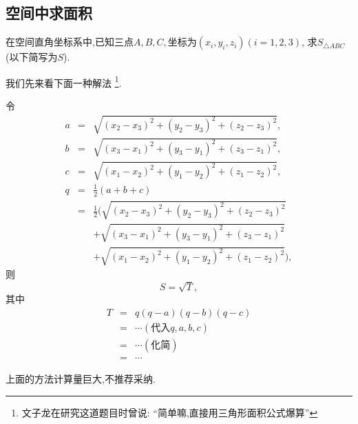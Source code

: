 \subsection{空间中求面积}

\prob 在空间直角坐标系中,已知三点$A,B,C,
\textrm{坐标为}(x_i,y_i,z_i)(i=1,2,3)$,
求$S_{\triangle ABC}$(以下简写为$S$).

我们先来看下面一种解法
\footnote{文子龙在研究这道题目时曾说:
``简单嘛,直接用三角形面积公式爆算''}.

\newcommand{\aaa}{\sqrt{(x_2-x_3)^2+(y_2-y_3)^2+(z_2-z_3)^2}}
\newcommand{\bbb}{\sqrt{(x_3-x_1)^2+(y_3-y_1)^2+(z_3-z_1)^2}}
\newcommand{\ccc}{\sqrt{(x_1-x_2)^2+(y_1-y_2)^2+(z_1-z_2)^2}}
\newcommand{\qqq}{q}

\sol
% 
令
\begin{eqnarray}
a&=&\aaa, \nonumber\\
b&=&\bbb, \nonumber\\
c&=&\ccc, \nonumber\\
q&=&\frac{1}{2}(a+b+c) \nonumber\\
 &=& \frac{1}{2}(\aaa \nonumber\\
 && +\bbb \nonumber\\
 && +\ccc \nonumber),
\end{eqnarray}
则$$S=\sqrt{T},$$
其中
\begin{eqnarray}
  T&=&q(q-a)(q-b)(q-c) \nonumber \\  
  &=&\cdots(\textrm{代入}q,a,b,c) \nonumber \\
  &=&\cdots(\textrm{化简}) \nonumber \\
  &=&\cdots \nonumber 
\end{eqnarray}
\solend

上面的方法计算量巨大,不推荐采纳.

